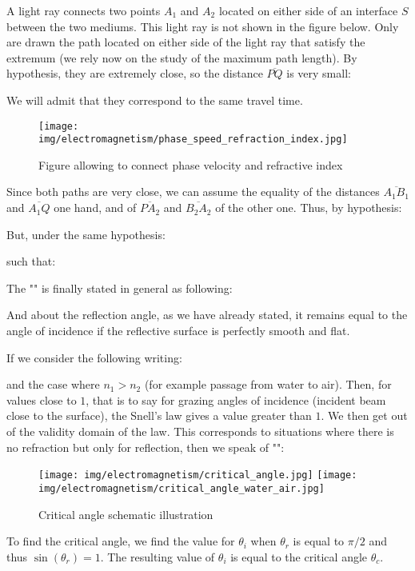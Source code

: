 	A light ray connects two points $A_1$ and $A_2$ located on either side of an interface $S$ between the two mediums. This light ray is not shown in the figure below. Only are drawn the path located on either side of the light ray that satisfy the extremum (we rely now on the study of the maximum path length). By hypothesis, they are extremely close, so the distance $\overline{PQ}$ is very small:
	
	We will admit that they correspond to the same travel time.
	
	\begin{figure}[H]
		\centering
		\texttt{[image: img/electromagnetism/phase\_speed\_refraction\_index.jpg]}
		\caption{Figure allowing to connect phase velocity and refractive index}
	\end{figure}
	Since both paths are very close, we can assume the equality of the distances $\overline{A_1B_1}$ and $\overline{A_1Q}$ one hand, and of $\overline{PA_2}$ and $\overline{B_2A_2}$ of the other one. Thus, by hypothesis:
	
	But, under the same hypothesis:
	
	such that:
	
	The "" is finally stated in general as following:
	
	And about the reflection angle, as we have already stated, it remains equal to the angle of incidence if the reflective surface is perfectly smooth and flat.
	
	If we consider the following writing:
	
	and the case where $n_1>n_2$ (for example passage from water to air). Then, for values close to $1$, that is to say for grazing angles of incidence (incident beam close to the surface), the Snell's law gives a value greater than $1$. We then get out of the validity domain of the law. This corresponds to situations where there is no refraction but only for reflection, then we speak of "\label{total reflection}":
	\begin{figure}[H]
		\centering
		\texttt{[image: img/electromagnetism/critical\_angle.jpg]}
		\texttt{[image: img/electromagnetism/critical\_angle\_water\_air.jpg]}
		\caption{Critical angle schematic illustration}
	\end{figure}
	To find the critical angle, we find the value for $\theta_i$ when $\theta_r$ is equal to $\pi/2$ and thus $\sin(\theta _r)=1$. The resulting value of $\theta _i$ is equal to the critical angle $\theta_c$.

